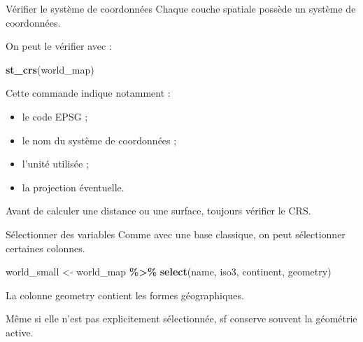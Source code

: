 \documentclass[
  10pt,
  ignorenonframetext,
]{beamer}
\newenvironment{Shaded}{\begin{snugshade}}{\end{snugshade}}
\newcommand{\FunctionTok}[1]{\textcolor[rgb]{0.13,0.29,0.53}{\textbf{#1}}}
\newcommand{\NormalTok}[1]{#1}
\newcommand{\OtherTok}[1]{\textcolor[rgb]{0.56,0.35,0.01}{#1}}
\newcommand{\SpecialCharTok}[1]{\textcolor[rgb]{0.81,0.36,0.00}{\textbf{#1}}}
\begin{document}
\begin{frame}[fragile]{Vérifier le système de coordonnées}
\label{vuxe9rifier-le-systuxe8me-de-coordonnuxe9es}
Chaque couche spatiale possède un système de coordonnées.

On peut le vérifier avec :

\begin{Shaded}
\begin{Highlighting}[]
\FunctionTok{st\_crs}\NormalTok{(world\_map)}
\end{Highlighting}
\end{Shaded}

Cette commande indique notamment :

\begin{itemize}
\item le code EPSG ;
\item le nom du système de coordonnées ;
\item l’unité utilisée ;
\item la projection éventuelle.
\end{itemize}

Avant de calculer une distance ou une surface, toujours vérifier le CRS.
\end{frame}

\begin{frame}[fragile]{Sélectionner des variables}
\label{suxe9lectionner-des-variables}
Comme avec une base classique, on peut sélectionner certaines colonnes.

\begin{Shaded}
\begin{Highlighting}[]
\NormalTok{world\_small }\OtherTok{\textless{}{-}}\NormalTok{ world\_map }\SpecialCharTok{\%\textgreater{}\%}
  \FunctionTok{select}\NormalTok{(name, iso3, continent, geometry)}
\end{Highlighting}
\end{Shaded}

La colonne geometry contient les formes géographiques.

Même si elle n'est pas explicitement sélectionnée, sf conserve souvent
la géométrie active.
\end{frame}
\end{document}
